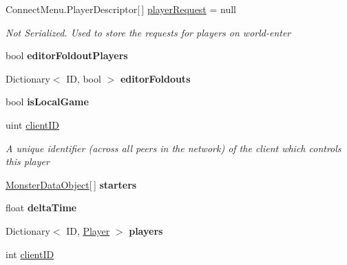 \begin{DoxyCompactItemize}
\item 
Connect\-Menu.\-Player\-Descriptor\mbox{[}$\,$\mbox{]} \hyperlink{class_game_state_a8b1949523ac8e40776c0617666023d64}{player\-Request} = null
\begin{DoxyCompactList}\small\item\em Not Serialized. Used to store the requests for players on world-\/enter \end{DoxyCompactList}\item 
\hypertarget{class_game_state_ad68ed3f1f32060bfff68d296e6750712}{bool {\bfseries editor\-Foldout\-Players}}\label{class_game_state_ad68ed3f1f32060bfff68d296e6750712}

\item 
\hypertarget{class_game_state_a47358e83d829da7a28c49f8d0a795125}{Dictionary$<$ I\-D, bool $>$ {\bfseries editor\-Foldouts}}\label{class_game_state_a47358e83d829da7a28c49f8d0a795125}

\item 
\hypertarget{class_game_state_aa4cba70bc38a13e80439dc784c6ca12e}{bool {\bfseries is\-Local\-Game}}\label{class_game_state_aa4cba70bc38a13e80439dc784c6ca12e}

\item 
uint \hyperlink{class_game_state_ad24a423ba6655fc6541b2f12ce98e0d0}{client\-I\-D}
\begin{DoxyCompactList}\small\item\em A unique identifier (across all peers in the network) of the client which controls this player \end{DoxyCompactList}\item 
\hypertarget{class_game_state_a3d88394849f2356b1c1917f8bb9cc873}{\hyperlink{class_monster_data_object}{Monster\-Data\-Object}\mbox{[}$\,$\mbox{]} {\bfseries starters}}\label{class_game_state_a3d88394849f2356b1c1917f8bb9cc873}

\item 
\hypertarget{class_game_state_a857eed8c97274c3dd9d3eb558a33f855}{float {\bfseries delta\-Time}}\label{class_game_state_a857eed8c97274c3dd9d3eb558a33f855}

\item 
\hypertarget{class_game_state_aed9c4cf83c497c6e36585e0ed3999564}{Dictionary$<$ I\-D, \hyperlink{class_game_state_1_1_player}{Player} $>$ {\bfseries players}}\label{class_game_state_aed9c4cf83c497c6e36585e0ed3999564}

\item 
\hypertarget{class_game_state_adb8c9c7f10d683332cbd62927d35cb35}{int \hyperlink{class_game_state_adb8c9c7f10d683332cbd62927d35cb35}{client\-I\-D}}\label{class_game_state_adb8c9c7f10d683332cbd62927d35cb35}


\end{DoxyCompactItemize}
